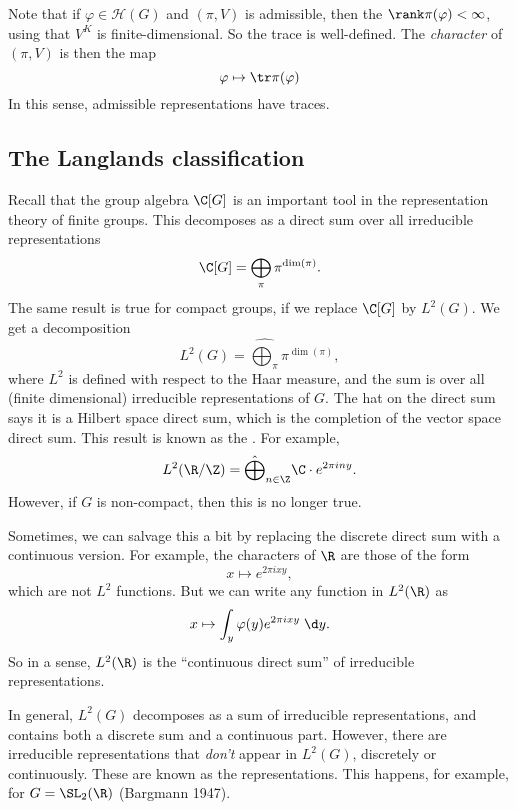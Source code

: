 \documentclass[a4paper]{article}
\begin{document}
Note that if $\varphi \in \mathcal{H}(G)$ and $(\pi, V)$ is admissible, then the $\rank \pi(\varphi) < \infty$, using that $V^K$ is finite-dimensional. So the trace is well-defined. The \emph{character} of $(\pi, V)$ is then the map
\[
  \varphi \mapsto \tr \pi(\varphi)
\]
In this sense, admissible representations have traces.
\subsection{The Langlands classification}
Recall that the group algebra $\C[G]$ is an important tool in the representation theory of finite groups. This decomposes as a direct sum over all irreducible representations
\[
  \C[G] = \bigoplus_{\pi} \pi^{\dim (\pi)}.
\]
The same result is true for compact groups, if we replace $\C[G]$ by $L^2(G)$. We get a decomposition
\[
  L^2(G) = \hat{\bigoplus_{\pi}} \pi^{\dim (\pi)},
\]
where $L^2$ is defined with respect to the Haar measure, and the sum is over all (finite dimensional) irreducible representations of $G$. The hat on the direct sum says it is a Hilbert space direct sum, which is the completion of the vector space direct sum. This result is known as the . For example,
\[
  L^2(\R/\Z) = \hat{\bigoplus}_{n \in \Z} \C \cdot e^{2\pi i n y}.
\]
However, if $G$ is non-compact, then this is no longer true.

Sometimes, we can salvage this a bit by replacing the discrete direct sum with a continuous version. For example, the characters of $\R$ are those of the form
\[
  x \mapsto e^{2\pi i xy},
\]
which are not $L^2$ functions. But we can write any function in $L^2(\R)$ as
\[
  x \mapsto \int_y \varphi(y) e^{2\pi i xy} \;\d y.
\]
So in a sense, $L^2(\R)$ is the ``continuous direct sum'' of irreducible representations.

In general, $L^2(G)$ decomposes as a sum of irreducible representations, and contains both a discrete sum and a continuous part. However, there are irreducible representations that \emph{don't} appear in $L^2(G)$, discretely or continuously. These are known as the  representations. This happens, for example, for $G = \SL_2(\R)$ (Bargmann 1947).

\end{document}
